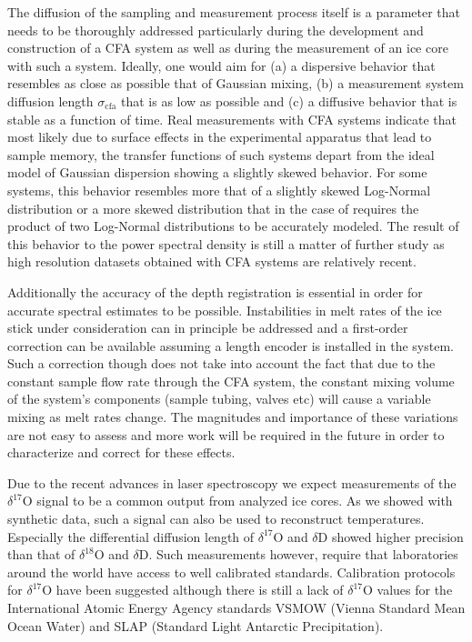 \documentclass[11pt, draftcls, onecolumn]{IEEEtran} %
\numberwithin{equation}{section}
\numberwithin{table}{section}
\numberwithin{figure}{section}
\begin{document}
The diffusion of the sampling and measurement process itself is a parameter that needs to be 
thoroughly addressed particularly during the development and construction of a CFA system
as well as during the measurement of an ice core with such a system.
Ideally, one would aim for (a) a dispersive behavior  that resembles as close as possible that of Gaussian
mixing, (b) a measurement system diffusion length $\sigma_{\mathrm{cfa}}$ that is as low as possible
and (c) a diffusive behavior that is stable as a function of time.
Real measurements with CFA systems indicate that most likely due to surface effects in the experimental apparatus
that lead to sample memory, the transfer functions of such systems depart from the ideal model of
Gaussian dispersion showing a slightly skewed behavior. 
For some systems, this behavior resembles more that of a slightly skewed Log-Normal distribution \citep{Gkinis2011, Maselli2013, Emanuelsson2015}
or a more skewed distribution that in the case of \citet{Jones2017a} requires the product of two Log-Normal distributions to be accurately modeled.
The result of this behavior to the power spectral density is still a matter of further study as high resolution datasets obtained with CFA systems 
are relatively recent.

Additionally the accuracy of the depth registration is essential in order for accurate spectral estimates to be possible.
Instabilities in melt rates of the ice stick under consideration can in principle be addressed  and a first-order correction
can be available assuming a length encoder is installed in the system.
Such a correction though does not take into account the fact that due to the constant sample flow rate through the CFA system,
the constant mixing volume of the system's components (sample tubing, valves etc) will cause a variable mixing as melt rates change.
The magnitudes and importance of these variations are not easy to assess and more work will be required in the future in order 
to characterize and correct for these effects.

Due to the recent advances in laser spectroscopy we expect measurements of the $\delta^{17}$O signal to be a common output from analyzed ice cores.
As we showed with synthetic data, such a signal can also be used to reconstruct temperatures. Especially the differential diffusion length of $\delta^{17}$O and $\delta$D showed higher precision than that of $\delta^{18}$O and $\delta$D. Such measurements however, require that laboratories around the world have access to well calibrated standards. Calibration protocols for $\delta^{17}$O have been suggested \citep{Schoenemannn2013} although there is still a lack of $\delta^{17}$O values for the International Atomic Energy Agency standards VSMOW (Vienna Standard Mean Ocean Water) and SLAP (Standard Light Antarctic Precipitation).  
\end{document}
